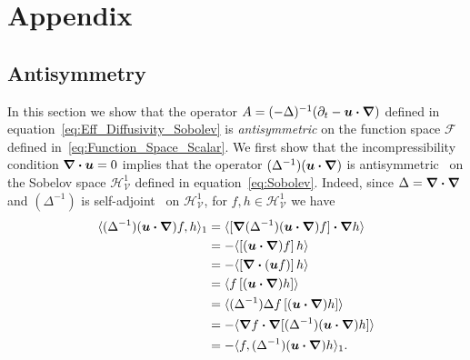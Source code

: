 \documentclass[leqno,onefignum,onetabnum]{siamltex1213}
\newcommand{\Vc}{\mathcal{V}}
\newcommand{\Hs}{\mathscr{H}}
\newcommand{\Fs}{\mathscr{F}}
\newcommand\bnabla{\mbox{\boldmath${\nabla}$}}
\providecommand\bcdot{\boldsymbol{\cdot}}
\newcommand{\vecu}{\boldsymbol{u}}
\begin{document}


\appendix
%
\section{Appendix}\label{sec:Appendix}
%
\subsection{Antisymmetry}\label{sec:Antisymmetry}
%
In this section we show that the operator
$A=(-\Delta)^{-1}(\partial_t-\vecu\bcdot\bnabla)$ defined
in equation~\eqref{eq:Eff_Diffusivity_Sobolev} is \emph{antisymmetric} on
the function space $\Fs$ defined
in~\eqref{eq:Function_Space_Scalar}. We first show that the
incompressibility condition $\bnabla\bcdot\vecu=0$ implies that the
operator $(\Delta^{-1})(\vecu\bcdot\bnabla )$ is 
antisymmetric~\cite{Bhattacharya:AAP:1999:951} on the Sobelov space
$\Hs^1_{\Vc}$ defined in equation~\eqref{eq:Sobolev}. Indeed, since 
$\Delta=\bnabla\bcdot\bnabla$ and $(\Delta^{-1})$ is
self-adjoint~\cite{Stakgold:BVP:2000} on $\Hs^1_{\Vc}$, for
$f,h\in\Hs^1_{\Vc}$ we have   
%
\begin{align}\label{eq:Anti-sym_Sobolev}
  \langle(\Delta^{-1})(\vecu \bcdot\bnabla )f,h\rangle_1
                            &=\langle[\bnabla (\Delta^{-1})(\vecu \bcdot\bnabla )f]\bcdot\bnabla h\rangle
                                 \\                              
                              &=-\langle[(\vecu \bcdot\bnabla )f]\,h\rangle
                                 \notag\\
                               &=-\langle[\bnabla \bcdot(\vecu f)]\,h\rangle
                                 \notag\\     
                              &=\langle f\,[(\vecu \bcdot\bnabla )h]\rangle
                                \notag\\
                              &=\langle(\Delta^{-1})\Delta f\,[(\vecu \bcdot\bnabla )h]\rangle
                                \notag\\
                              &=-\langle\bnabla f\bcdot\bnabla[(\Delta^{-1})(\vecu \bcdot\bnabla )h]\rangle
                                \notag\\                              
                              &=-\langle f,(\Delta^{-1})(\vecu \bcdot\bnabla )h\rangle_1.
                              \notag
\end{align}
\end{document}
